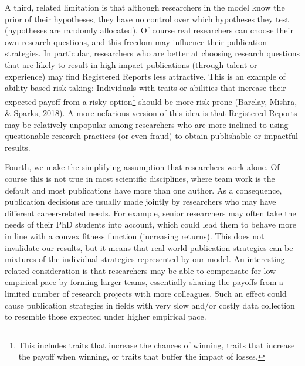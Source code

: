 \documentclass[
  ,man,mask,floatsintext]{apa6}
\begin{document}
A third, related limitation is that although researchers in the model know the prior of their hypotheses, they have no control over
which hypotheses they test (hypotheses are randomly allocated).
Of course real researchers can choose their own research questions, and this freedom may influence their publication strategies.
In particular, researchers who are better at choosing research questions that are likely to result in high-impact publications (through talent or experience) may find Registered Reports less attractive.
This is an example of ability-based risk taking:
Individuals with traits or abilities that increase their expected payoff from a risky option\footnote{This includes traits that increase the chances of winning, traits that increase the payoff when winning, or traits that buffer the impact of losses.} should be more risk-prone (Barclay, Mishra, \& Sparks, 2018).
A more nefarious version of this idea is that Registered Reports may be relatively unpopular among researchers who are more inclined to using questionable research practices (or even fraud) to obtain publishable or impactful results.

Fourth, we make the simplifying assumption that researchers work alone.
Of course this is not true in most scientific disciplines, where team work is the default and most publications have more than one author.
As a consequence, publication decisions are usually made jointly by researchers who may have different career-related needs.
For example, senior researchers may often take the needs of their PhD students into account, which could lead them to behave more in line with a convex fitness function (increasing returns).
This does not invalidate our results, but it means that
real-world publication strategies can be mixtures of the individual strategies represented by our model.
An interesting related consideration is that researchers may be able to compensate for low empirical pace by forming larger teams, essentially sharing the payoffs from a limited number of research projects with more colleagues.
Such an effect could cause publication strategies in fields with very slow and/or costly data collection to resemble those expected under higher empirical pace.
\end{document}
